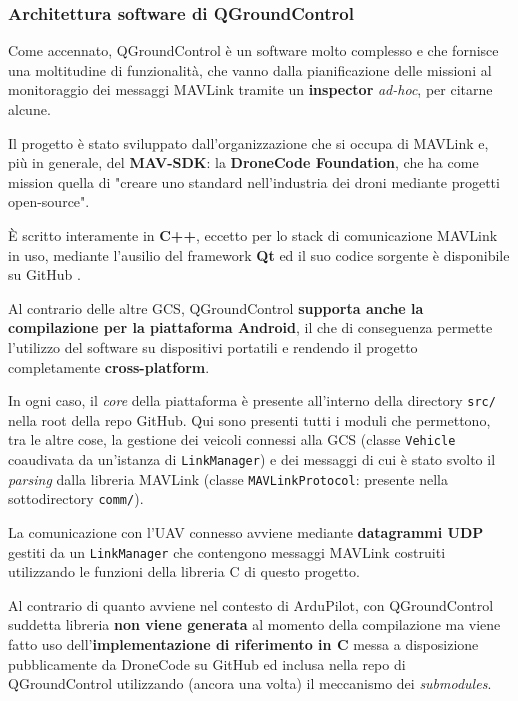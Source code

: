 \documentclass[a4paper, 12pt, oneside]{article}
\begin{document}
\subsubsection{Architettura software di QGroundControl}

Come accennato, QGroundControl è un software molto complesso e che fornisce una moltitudine di funzionalità, che vanno dalla pianificazione delle missioni al monitoraggio dei messaggi MAVLink tramite un \textbf{inspector} \textit{ad-hoc}, per citarne alcune.

Il progetto è stato sviluppato dall'organizzazione che si occupa di MAVLink e, più in generale, del \textbf{MAV-SDK}: la \textbf{DroneCode Foundation}, che ha come mission quella di "creare uno standard nell'industria dei droni mediante progetti open-source"\cite{dronecode}. 

È scritto interamente in \textbf{C++}, eccetto per lo stack di comunicazione MAVLink in uso, mediante l'ausilio del framework \textbf{Qt} ed il suo codice sorgente è disponibile su GitHub \cite{qgc-github}.

Al contrario delle altre GCS, QGroundControl \textbf{supporta anche la compilazione per la piattaforma Android}\cite{qgc-github-android}, il che di conseguenza permette l'utilizzo del software su dispositivi portatili e rendendo il progetto completamente \textbf{cross-platform}.

In ogni caso, il \textit{core} della piattaforma è presente all'interno della directory \texttt{src/} nella root della repo GitHub. Qui sono presenti tutti i moduli che permettono, tra le altre cose, la gestione dei veicoli connessi alla GCS (classe \texttt{Vehicle} coaudivata da un'istanza di \texttt{LinkManager}) e dei messaggi di cui è stato svolto il \textit{parsing} dalla libreria MAVLink (classe \texttt{MAVLinkProtocol}: presente nella sottodirectory \texttt{comm/}).

La comunicazione con l'UAV connesso avviene mediante \textbf{datagrammi UDP} gestiti da un \texttt{LinkManager} che contengono messaggi MAVLink costruiti utilizzando le funzioni della libreria C di questo progetto.

Al contrario di quanto avviene nel contesto di ArduPilot, con QGroundControl suddetta libreria \textbf{non viene generata} al momento della compilazione ma viene fatto uso dell'\textbf{implementazione di riferimento in C} \cite{mavlink-c-implementation} messa a disposizione pubblicamente da DroneCode su GitHub ed inclusa nella repo di QGroundControl utilizzando (ancora una volta) il meccanismo dei \textit{submodules}.
\end{document}
